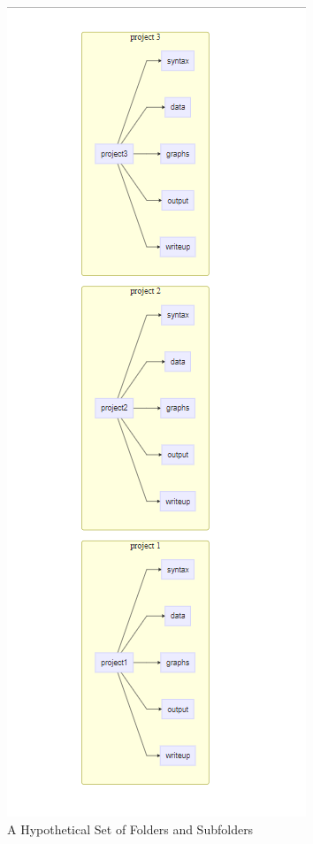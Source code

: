 \documentclass[
  letterpaper,
  DIV=11,
  numbers=noendperiod]{scrreprt}
\begin{document}
\begin{figure}[H]

{\centering \includegraphics{storage.png}

}

\caption{A Hypothetical Set of Folders and Subfolders}

\end{figure}%

\end{document}
